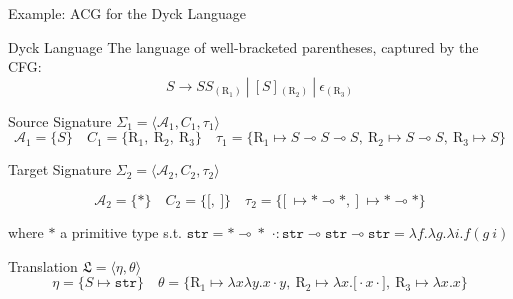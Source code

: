\documentclass{beamer}
\newcommand{\li}{\!\multimap\!}
\begin{document}
\begin{frame}{Example: ACG for the Dyck Language}
	\small
	\begin{block}{Dyck Language}
		The language of well-bracketed parentheses, captured by the CFG:
		\[
			S \to SS {}_{(\mathrm{R}_1)} \ | \  [S]  {}_{(\mathrm{R}_2)} \ | \ \epsilon {}_{(\mathrm{R}_3)}
		\]
	\end{block}

	\alert{Source Signature} $\Sigma_1 = \langle \mathcal{A}_1, C_1, \tau_1 \rangle$
	{\footnotesize
	\[
	\mathcal{A}_1 = \{S\}  
	\quad  C_1= \{\mathrm{R}_1,\ \mathrm{R}_2,\ \mathrm{R}_3\} 
	\quad \tau_1 = \{ \mathrm{R}_1 \mapsto S\li S\li S, 
		\ \mathrm{R}_2 \mapsto S\li S,
		\ \mathrm{R}_3 \mapsto S\}
	\]}

	\alert{Target Signature} $\Sigma_2 = \langle \mathcal{A}_2, C_2, \tau_2 \rangle$
	{\footnotesize
	\[
	\mathcal{A}_2 = \{ * \}
	\quad  C_2= \{ \texttt{[},\ \texttt{]} \} 
	\quad \tau_2 = \{ \texttt{[} \ \mapsto * \li *,\ \texttt{]} \ \mapsto * \li *\}
	\]
	\begin{flushright}
		where $*$ a primitive type s.t. $\texttt{str}=*\li *$
		$\cdot: \texttt{str}\li \texttt{str}\li \texttt{str} = \lambda f.\lambda g.\lambda i.f(g \ i)$
	\end{flushright}		
	}
	
	\alert{Translation} $\mathfrak{L} = \langle \eta, \theta \rangle$
	{\footnotesize
	\[
	\eta = \{ S \mapsto \texttt{str}\} \quad 
	\theta = \{ \mathrm{R}_1 \mapsto \lambda x \lambda y.x\cdot y,
	 \ \mathrm{R}_2 \mapsto \lambda x.\texttt{[} \cdot x \cdot \texttt{]},
	 \ \mathrm{R}_3 \mapsto \lambda x.x
	\}
	\]
	}
\end{frame}
\end{document}
